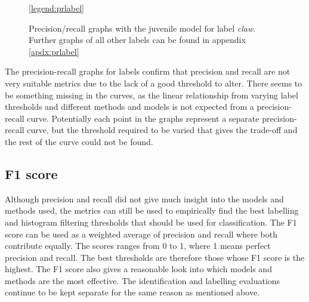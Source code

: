\begin{figure}[H]
\centering
{}
\ref{legend:prlabel}
\caption{Precision/recall graphs with the juvenile model for label \textit{claw}. Further graphs of all other labels can be found in appendix \ref{apdx:prlabel}}
\end{figure}
\noindent
The precision-recall graphs for labels confirm that precision and recall are not very suitable metrics due to the lack of a good threshold to alter. There seems to be something missing in the curves, as the linear relationship from varying label thresholds and different methods and models is not expected from a precision-recall curve. Potentially each point in the graphs represent a separate precision-recall curve, but the threshold required to be varied that gives the trade-off and the rest of the curve could not be found.
%
%
%


\subsection{F1 score}
Although precision and recall did not give much insight into the models and methods used, the metrics can still be used to empirically find the best labelling and histogram filtering thresholds that should be used for classification. The F1 score can be used as a weighted average of precision and recall where both contribute equally. The scores ranges from 0 to 1, where 1 means perfect precision and recall. The best thresholds are therefore those whose F1 score is the highest. The F1 score also gives a reasonable look into which models and methods are the most effective. The identification and labelling evaluations continue to be kept separate for the same reason as mentioned above. 
